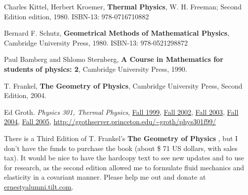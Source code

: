\documentclass[twoside]{amsart}
\theoremstyle{plain}
\theoremstyle{definition}
\begin{document}
\begin{thebibliography}{9}
Charles Kittel, Herbert Kroemer, \textbf{Thermal Physics}, W. H. Freeman; Second Edition edition, 1980. 
ISBN-13: 978-0716710882

Bernard F. Schutz, \textbf{Geometrical Methods of Mathematical Physics}, Cambridge University Press, 1980.
ISBN-13: 978-0521298872

Paul Bamberg and Shlomo Sternberg,
\textbf{A Course in Mathematics for students of physics: 2}, 
Cambridge University Press, 
1990.


T. Frankel,
\textbf{The Geometry of Physics}, 
Cambridge University Press, 
Second Edition,
2004.

Ed Groth. \emph{Physics 301, Thermal Physics}, \href{http://grothserver.princeton.edu/~groth/phys301f99/}{Fall 1999}, \href{http://grothserver.princeton.edu/~groth/phys301f02/index.htmlx}{Fall 2002}, \href{http://grothserver.princeton.edu/~groth/phys301f03/index.htmlx}{Fall 2003}, \href{http://grothserver.princeton.edu/~groth/phys301f04/index.htmlx}{Fall 2004}, \href{http://grothserver.princeton.edu/~groth/phy301f05/index.html}{Fall 2005}, 
\url{http://grothserver.princeton.edu/~groth/phys301f99/}


\end{thebibliography}

There is a Third Edition of T. Frankel's \textbf{The Geometry of Physics} \cite{TFrankel2004}, but I don't have the funds to purchase the book (about \$ 71 US dollars, with sales tax). It would be nice to have the hardcopy text to see new updates and to use for research, as the second edition allowed me to formulate fluid mechanics and elasticity in a covariant manner.  Please help me out and donate at \url{ernestyalumni.tilt.com}. 
\end{document}
